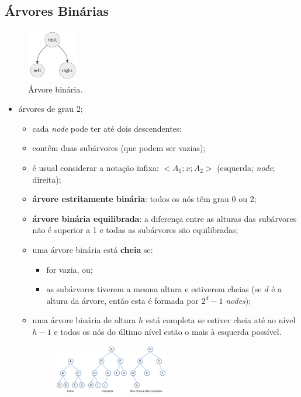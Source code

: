 \documentclass[a4paper, 12pt]{article}
\begin{document}
\subsection{Árvores Binárias}
\begin{center}
    \begin{figure}[H]
        \centering
        \includegraphics[width=0.2\textwidth]{fig/t/tb.png}
        \caption{Árvore binária.}
    \end{figure}
\end{center}
\begin{itemize}
    \item árvores de grau 2;
    \begin{itemize}
        \item cada \emph{node} pode ter até dois descendentes;
        \item contêm duas subárvores (que podem ser vazias);
        \item é usual considerar a notação infixa: $<A_1;x;A_2>$ (esquerda; \emph{node}; direita);
        \item \textbf{árvore estritamente binária}: todos os nós têm grau 0 ou 2;
        \item \textbf{árvore binária equilibrada}: a diferença entre as alturas das subárvores não é superior a 1 e todas as subárvores são equilibradas;
        \item uma árvore binária está \textbf{cheia} se:
        \begin{itemize}
            \item for vazia, ou;
            \item as subárvores tiverem a mesma altura e estiverem cheias (se $d$ é a altura da árvore, então esta é formada por $2^d-1$ \emph{nodes});
        \end{itemize}
        \item uma árvore binária de altura $h$ está completa se estiver cheia até ao nível $h-1$ e todos os nós do último nível estão o mais à esquerda possível.
        \begin{center}
            \begin{figure}[H]
                \centering
                \includegraphics[width=0.5\textwidth]{fig/t/btcompletefull.png}
            \end{figure}
        \end{center}
    \end{itemize}
\end{itemize}
\end{document}
